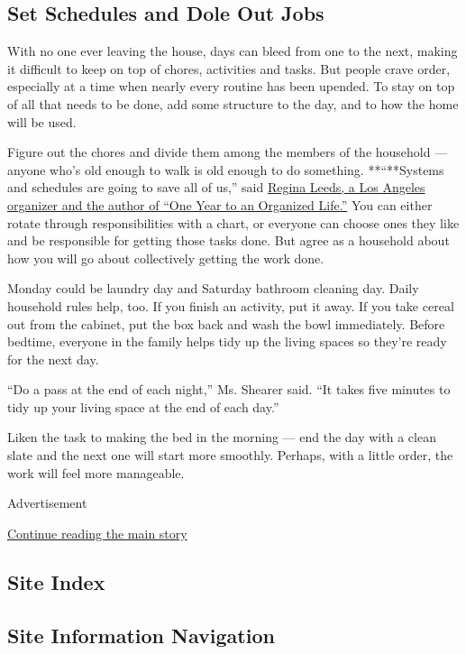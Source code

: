 \hypertarget{set-schedules-and-dole-out-jobs}{%
\subsection{Set Schedules and Dole Out
Jobs}\label{set-schedules-and-dole-out-jobs}}

With no one ever leaving the house, days can bleed from one to the next,
making it difficult to keep on top of chores, activities and tasks. But
people crave order, especially at a time when nearly every routine has
been upended. To stay on top of all that needs to be done, add some
structure to the day, and to how the home will be used.

Figure out the chores and divide them among the members of the household
--- anyone who's old enough to walk is old enough to do something.
**``**Systems and schedules are going to save all of us,'' said
\href{https://www.reginaleeds.com/books}{Regina Leeds, a Los Angeles
organizer and the author of ``One Year to an Organized Life.''} You can
either rotate through responsibilities with a chart, or everyone can
choose ones they like and be responsible for getting those tasks done.
But agree as a household about how you will go about collectively
getting the work done.

Monday could be laundry day and Saturday bathroom cleaning day. Daily
household rules help, too. If you finish an activity, put it away. If
you take cereal out from the cabinet, put the box back and wash the bowl
immediately. Before bedtime, everyone in the family helps tidy up the
living spaces so they're ready for the next day.

``Do a pass at the end of each night,'' Ms. Shearer said. ``It takes
five minutes to tidy up your living space at the end of each day.''

Liken the task to making the bed in the morning --- end the day with a
clean slate and the next one will start more smoothly. Perhaps, with a
little order, the work will feel more manageable.

Advertisement

\protect\hyperlink{after-bottom}{Continue reading the main story}

\hypertarget{site-index}{%
\subsection{Site Index}\label{site-index}}

\hypertarget{site-information-navigation}{%
\subsection{Site Information
Navigation}\label{site-information-navigation}}

